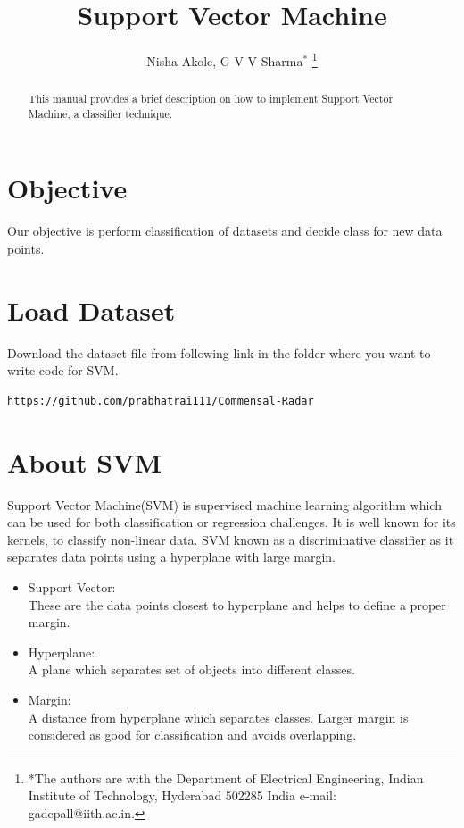 \documentclass[journal,12pt,twocolumn]{IEEEtran}
\begin{document}
\title{ Support Vector Machine}

\author{Nisha Akole, G V V 
Sharma$^{*}$%
\thanks{*The authors are with the Department
of Electrical Engineering, Indian Institute of Technology, Hyderabad
502285 India e-mail:  gadepall@iith.ac.in.}
}

\maketitle

\tableofcontents

\bigskip
\begin{abstract}
This manual provides a brief description on how to implement Support Vector Machine, a classifier technique.
\end{abstract}

\IEEEpeerreviewmaketitle

\section{Objective}

Our objective is perform classification of datasets and decide class for new data points. 
\section{Load Dataset}
Download the dataset file from following link in the folder where you want to write code for SVM.
\begin{lstlisting}
https://github.com/prabhatrai111/Commensal-Radar
\end{lstlisting}

\section{About SVM}
Support Vector Machine(SVM) is supervised machine learning algorithm which can be used for both classification or regression challenges. It is well known for its kernels, to classify non-linear data. SVM known as a discriminative classifier as it separates data points using a hyperplane with large margin.\\
\begin{itemize}
\item Support Vector:\\
	These are the data points closest to hyperplane and helps to define a proper margin.\\
\item Hyperplane:\\
	A plane which separates set of objects into different classes.\\
\item Margin:\\
	A distance from hyperplane which separates classes. Larger margin is considered as good for classification and avoids overlapping.
\end{itemize}
\end{document}
